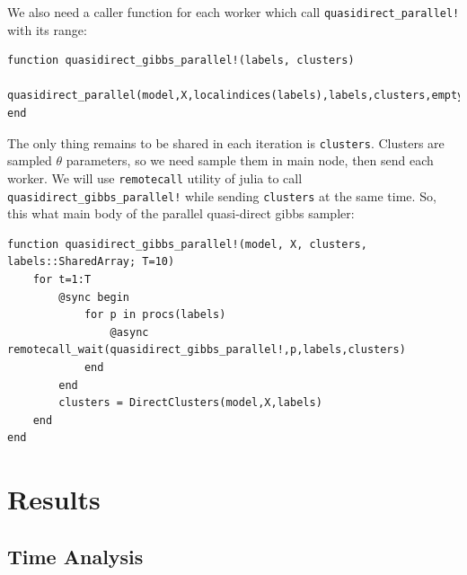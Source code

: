 \documentclass[a4paper]{article}
\begin{document}
We also need a caller function for each worker which call
\texttt{quasidirect\_parallel!} with its range:
\begin{lstlisting}
function quasidirect_gibbs_parallel!(labels, clusters) 		   			
    quasidirect_parallel(model,X,localindices(labels),labels,clusters,empty_cluster)
end 
\end{lstlisting}


The only thing remains to be shared in each iteration is
\texttt{clusters}. Clusters are sampled \(\theta\) parameters, so we
need sample them in main node, then send each worker. We will use
\texttt{remotecall} utility of julia to call
\texttt{quasidirect\_gibbs\_parallel!} while sending \texttt{clusters} at the
same time. So, this what main body of the parallel quasi-direct gibbs sampler:

\begin{lstlisting}
function quasidirect_gibbs_parallel!(model, X, clusters, labels::SharedArray; T=10)
    for t=1:T
        @sync begin
            for p in procs(labels)
                @async remotecall_wait(quasidirect_gibbs_parallel!,p,labels,clusters)
            end
        end
        clusters = DirectClusters(model,X,labels)
    end
end
\end{lstlisting}



\section{Results}


\subsection{Time Analysis}
\end{document}
